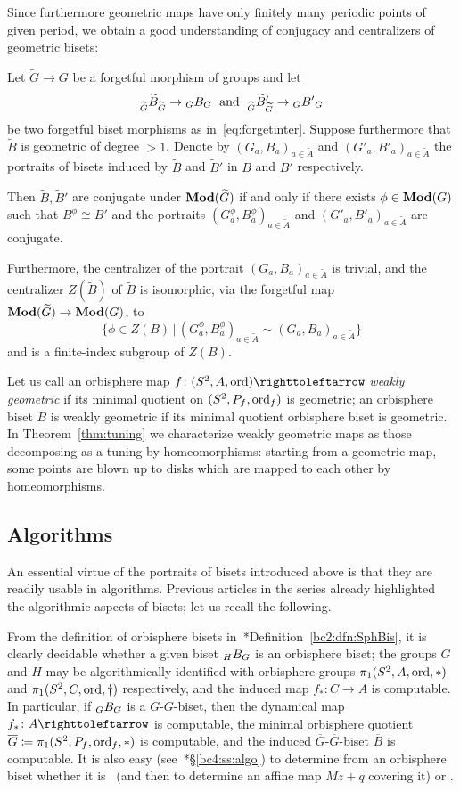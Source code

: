 \documentclass{amsart}
\newcommand\wtA{{\widetilde A}}
\newcommand\wtB{{\widetilde B}}
\newcommand\wtG{{\widetilde G}}
\begin{document}
Since furthermore geometric maps have only finitely many periodic
points of given period, we obtain a good understanding of conjugacy
and centralizers of geometric bisets:
\begin{mainthm}[= Theorem~\ref{thm:conjcentr}]\label{thm:RedConjCentrProb}
  Let $\wtG\to G$ be a forgetful morphism of groups and let
  \[\subscript\wtG\wtB_\wtG\to\subscript G B_G\;\text{ and }\; \subscript\wtG{\wtB'}_\wtG\to\subscript G{B'}_G
  \]
  be two forgetful biset morphisms as in~\eqref{eq:forgetinter}.
  Suppose furthermore that $\wtB$ is geometric of degree
  $>1$. Denote by $(G_a,B_a)_{a\in \wtA}$ and
  $(G'_a,B'_a)_{a\in \wtA}$ the portraits of bisets induced by
  $\wtB$ and $\wtB'$ in $B$ and $B'$ respectively.

  Then $\wtB,\wtB'$ are conjugate under
  $\Mod(\wtG)$ if and only if there exists $\phi\in\mathbf{\relax Mod}(G)$
  such that $B^\phi\cong B'$ and the portraits
  $(G_a^\phi,B_a^\phi)_{a\in \wtA}$ and
  $(G'_a,B'_a)_{a\in \wtA}$ are conjugate.

  Furthermore, the centralizer of the portrait
  $(G_a,B_a)_{a\in\wtA}$ is trivial, and the centralizer
  $Z(\wtB)$ of $\wtB$ is isomorphic, via the forgetful
  map $\Mod(\wtG)\to\Mod(G)$, to
  \[\big\{\phi\in Z(B)
    \,\big|\,(G_a^{\phi},B_a^{\phi})_{a\in \wtA}\sim(G_a,B_a)_{a\in
    \wtA}\big\}
  \]
  and is a finite-index subgroup of $Z(B)$.
\end{mainthm}

Let us call an orbisphere map $f\colon(S^2,A,\ord)\selfmap$
\emph{weakly geometric} if its minimal quotient on $(S^2,P_f,\operatorname{ord}_f)$
is geometric; an orbisphere biset $B$ is weakly geometric if its
minimal quotient orbisphere biset is geometric. In
Theorem~\ref{thm:tuning} we characterize weakly geometric maps as
those decomposing as a tuning by homeomorphisms: starting from a
geometric map, some points are blown up to disks which are mapped to
each other by homeomorphisms.

\subsection{Algorithms}
An essential virtue of the portraits of bisets introduced above is
that they are readily usable in algorithms. Previous articles in the
series already highlighted the algorithmic aspects of bisets; let us
recall the following.

From the definition of orbisphere bisets
in~\cite{bartholdi-dudko:bc2}*{Definition~\ref{bc2:dfn:SphBis}}, it is
clearly decidable whether a given biset $\subscript H B_G$ is an
orbisphere biset; the groups $G$ and $H$ may be algorithmically
identified with orbisphere groups $\pi_1(S^2,A,\operatorname{ord},*)$ and
$\pi_1(S^2,C,\operatorname{ord},\dagger)$ respectively, and the induced map
$f_*\colon C\to A$ is computable. In particular, if $\subscript G B_G$
is a $G$-$G$-biset, then the dynamical map $f_*\colon A\selfmap$ is
computable, the minimal orbisphere quotient
$\overline G\coloneqq\pi_1(S^2,P_f,\operatorname{ord}_f,*)$ is computable, and the
induced $\overline G$-$\overline G$-biset $\overline B$ is
computable. It is also easy
(see~\cite{bartholdi-dudko:bc4}*{\S\ref{bc4:ss:algo}}) to determine
from an orbisphere biset whether it is \Tor\ (and then to determine an
affine map $M z+q$ covering it) or \Exp.
\end{document}
